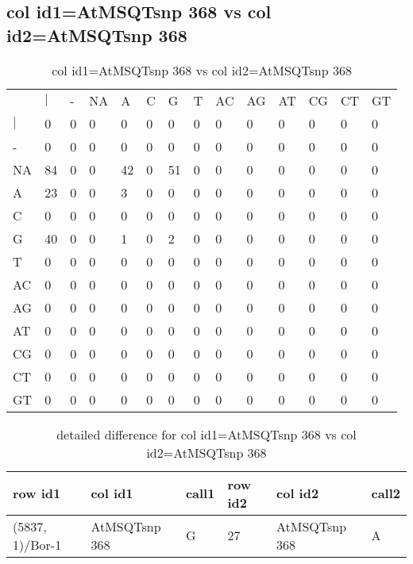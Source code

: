 \subsection{col id1=AtMSQTsnp 368 vs col id2=AtMSQTsnp 368}
\begin{center}
\begin{longtable}{|l|l|l|l|l|l|l|l|l|l|l|l|l|l|}
\caption{col id1=AtMSQTsnp 368 vs col id2=AtMSQTsnp 368} \label{table_dm692}\\
\hline
\\
\hline
&$|$&-&NA&A&C&G&T&AC&AG&AT&CG&CT&GT\\
$|$&0&0&0&0&0&0&0&0&0&0&0&0&0\\
-&0&0&0&0&0&0&0&0&0&0&0&0&0\\
NA&84&0&0&42&0&51&0&0&0&0&0&0&0\\
A&23&0&0&3&0&0&0&0&0&0&0&0&0\\
C&0&0&0&0&0&0&0&0&0&0&0&0&0\\
G&40&0&0&1&0&2&0&0&0&0&0&0&0\\
T&0&0&0&0&0&0&0&0&0&0&0&0&0\\
AC&0&0&0&0&0&0&0&0&0&0&0&0&0\\
AG&0&0&0&0&0&0&0&0&0&0&0&0&0\\
AT&0&0&0&0&0&0&0&0&0&0&0&0&0\\
CG&0&0&0&0&0&0&0&0&0&0&0&0&0\\
CT&0&0&0&0&0&0&0&0&0&0&0&0&0\\
GT&0&0&0&0&0&0&0&0&0&0&0&0&0\\
\hline
\end{longtable}
\end{center}

\begin{center}
\begin{longtable}{|l|l|l|l|l|l|}
\caption{detailed difference for col id1=AtMSQTsnp 368 vs col id2=AtMSQTsnp 368} \label{table_dm693}\\
\hline
row id1&col id1&call1&row id2&col id2&call2\\
\hline
(5837, 1)/Bor-1&AtMSQTsnp 368&G&27&AtMSQTsnp 368&A\\
\hline
\end{longtable}
\end{center}

